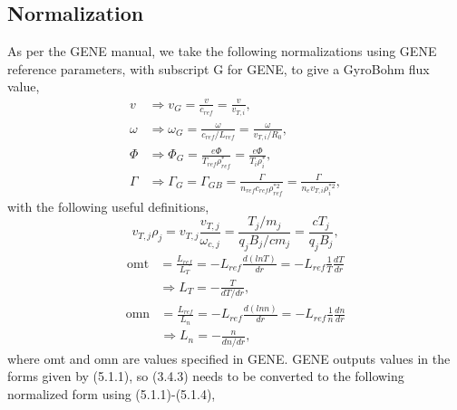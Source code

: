 \documentclass[12pt]{article}
\numberwithin{equation}{subsection}
\begin{document}
\subsection{Normalization}
   \quad As per the GENE manual\cite{GENE}, we take the following normalizations using GENE reference parameters, with subscript G for GENE,
to give a GyroBohm flux value,
   \begin{equation}
   \begin{aligned}
      v      &\Rightarrow v_G      = \frac{v}{c_{ref}} = \frac{v}{v_{T,i}}, \\
      \omega &\Rightarrow \omega_G = \frac{\omega}{c_{ref}/L_{ref}} = \frac{\omega}{v_{T,i}/R_0}, \\
      \Phi   &\Rightarrow \Phi_G   = \frac{e\Phi}{T_{ref}\rho_{ref}^*} = \frac{e\Phi}{T_i\rho_i^{*}},\\
      \Gamma &\Rightarrow \Gamma_G = \Gamma_{GB} = \frac{\Gamma}{n_{ref}c_{ref}\rho_{ref}^{*2}} = \frac{\Gamma}{n_ev_{T,i}\rho_i^{*2}},
   \end{aligned}
   \end{equation}
with the following useful definitions,
   \begin{equation}
      v_{T,j}\rho_j = v_{T,j}\frac{v_{T,j}}{\omega_{c,j}} = \frac{T_j/m_j}{q_jB_j/cm_j} = \frac{cT_j}{q_jB_j},
   \end{equation}
   \begin{equation}
   \begin{aligned}
      \mathrm{omt} &= \frac{L_{ref}}{L_T} = -L_{ref}\frac{d(lnT)}{dr} = -L_{ref}\frac{1}{T}\frac{dT}{dr} \\
                   &\Rightarrow L_T = -\frac{T}{dT/dr},
   \end{aligned}
   \end{equation}
   \begin{equation}
   \begin{aligned}
      \mathrm{omn} &= \frac{L_{ref}}{L_n} = -L_{ref}\frac{d(lnn)}{dr} = -L_{ref}\frac{1}{n}\frac{dn}{dr} \\
                   &\Rightarrow L_n = -\frac{n}{dn/dr},
   \end{aligned}
   \end{equation}
where omt and omn are values specified in GENE\cite{GENE}. GENE outputs values in the forms given by (5.1.1), so
(3.4.3) needs to be converted to the following normalized form using (5.1.1)-(5.1.4),
\end{document}
